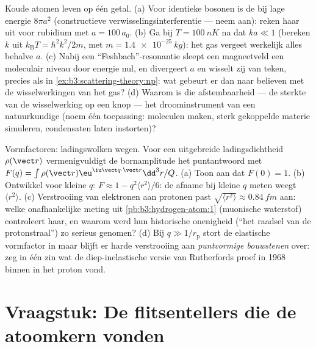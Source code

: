 \begin{exercise}[$\star\star\star$]\label{exo:b3:scattering-theory:11}
Koude atomen leven op één getal. (a) Voor identieke bosonen is de  bij lage energie $8\pi a^2$ (constructieve
verwisselingsinterferentie --- neem aan): reken haar uit voor rubidium met
$a =
100\,a_0$. (b) Ga bij $T = \qty{100}{nK}$ na dat $ka \ll 1$ (bereken
$k$ uit $k_{\text{B}}T = \hbar^2k^2/2m$, met $m =
\qty{1.4e-25}{kg}$): het
gas vergeet werkelijk alles behalve $a$. (c) Nabij een
``Feshbach''-resonantie sleept een magneetveld een moleculair niveau door
energie nul, en divergeert $a$ en wisselt zij van teken, precies als in
\cref{ex:b3:scattering-theory:np}: wat gebeurt er dan naar believen met de
wisselwerkingen van het gas? (d) Waarom is die afstembaarheid --- de
sterkte van de wisselwerking op een knop --- het droominstrument van een
natuurkundige (noem één toepassing: moleculen maken, sterk gekoppelde
materie simuleren, condensaten laten instorten)?
\end{exercise}

\begin{exercise}[$\star\star\star$]\label{exo:b3:scattering-theory:12}
Vormfactoren: ladingswolken wegen. Voor een uitgebreide ladingsdichtheid
$\rho(\vect r)$ vermenigvuldigt de bornamplitude het puntantwoord met
$F(q) = \int\rho(\vect r)\eu^{\iu\vect q\cdot\vect r}
\dd^3r/Q$. (a) Toon
aan dat $F(0) = 1$. (b) Ontwikkel voor kleine $q$: $F
\approx 1 - q^2\langle r^2\rangle/6$: de afname bij kleine $q$ meten weegt $\langle r^2\rangle$. (c) Verstrooiing van elektronen aan protonen past
$\sqrt{\langle r^2\rangle} \approx \qty{0.84}{fm}$ aan: welke onafhankelijke
meting uit \cref{pb:b3:hydrogen-atom:1} (muonische waterstof) controleert
haar, en waarom werd hun historische onenigheid (``het raadsel van de
protonstraal'') zo serieus genomen? (d) Bij $q \gg 1/r_{\text{p}}$ stort
de elastische vormfactor in maar blijft er harde verstrooiing aan
\emph{puntvormige bouwstenen} over: zeg in één zin wat de
diep-inelastische versie van Rutherfords proef in 1968 binnen in het
proton vond.
\end{exercise}

\section{Vraagstuk: De flitsentellers die de atoomkern vonden}

